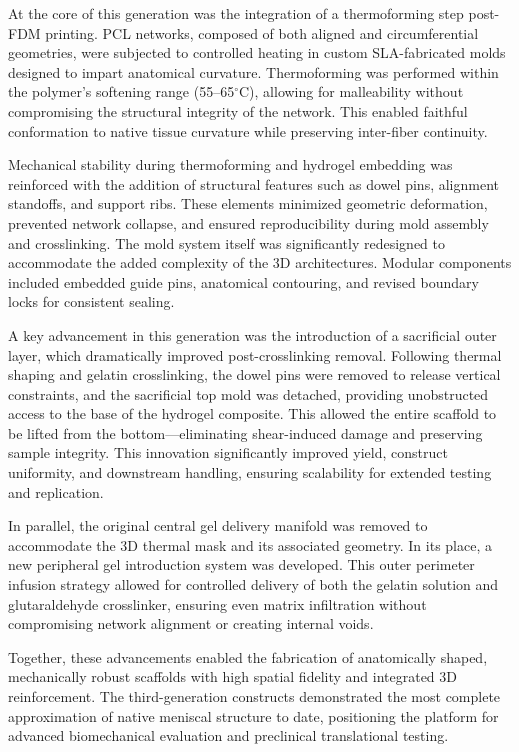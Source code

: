 At the core of this generation was the integration of a thermoforming step post-FDM printing. PCL networks, composed of both aligned and circumferential geometries, were subjected to controlled heating in custom SLA-fabricated molds designed to impart anatomical curvature. Thermoforming was performed within the polymer's softening range (55--65$^\circ$C), allowing for malleability without compromising the structural integrity of the network. This enabled faithful conformation to native tissue curvature while preserving inter-fiber continuity.

Mechanical stability during thermoforming and hydrogel embedding was reinforced with the addition of structural features such as dowel pins, alignment standoffs, and support ribs. These elements minimized geometric deformation, prevented network collapse, and ensured reproducibility during mold assembly and crosslinking. The mold system itself was significantly redesigned to accommodate the added complexity of the 3D architectures. Modular components included embedded guide pins, anatomical contouring, and revised boundary locks for consistent sealing.

A key advancement in this generation was the introduction of a sacrificial outer layer, which dramatically improved post-crosslinking removal. Following thermal shaping and gelatin crosslinking, the dowel pins were removed to release vertical constraints, and the sacrificial top mold was detached, providing unobstructed access to the base of the hydrogel composite. This allowed the entire scaffold to be lifted from the bottom—eliminating shear-induced damage and preserving sample integrity. This innovation significantly improved yield, construct uniformity, and downstream handling, ensuring scalability for extended testing and replication.

In parallel, the original central gel delivery manifold was removed to accommodate the 3D thermal mask and its associated geometry. In its place, a new peripheral gel introduction system was developed. This outer perimeter infusion strategy allowed for controlled delivery of both the gelatin solution and glutaraldehyde crosslinker, ensuring even matrix infiltration without compromising network alignment or creating internal voids.

Together, these advancements enabled the fabrication of anatomically shaped, mechanically robust scaffolds with high spatial fidelity and integrated 3D reinforcement. The third-generation constructs demonstrated the most complete approximation of native meniscal structure to date, positioning the platform for advanced biomechanical evaluation and preclinical translational testing.

